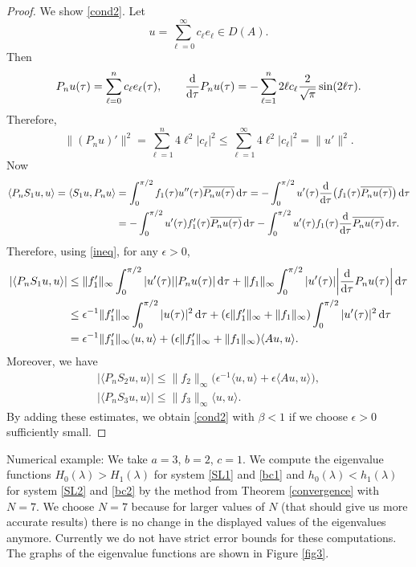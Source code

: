 \documentclass[10pt,a4paper]{amsart}
\numberwithin{equation}{section}
\begin{document}
\begin{proof}
We show \eqref{cond2}.
Let
\[ u=\sum_{\ell=0}^\infty c_\ell e_\ell \in D(A) .\]
Then
\[ P_n u(\tau)=\sum_{\ell=0}^n c_\ell e_\ell(\tau),\qquad \frac{{\rm d}}{{\rm d}\tau} P_n u(\tau)= -\sum_{\ell=1}^n 2\ell c_\ell\frac{2}{\sqrt\pi}\sin(2\ell \tau).\]
Therefore,
\begin{equation}\label{ineq}
 \|(P_n u)'\|^2=\sum_{\ell=1}^n 4\ell^2 |c_\ell|^2\le \sum_{\ell=1}^\infty 4\ell^2|c_\ell|^2=\|u'\|^2.
\end{equation}
Now
 \begin{align*}
\langle P_nS_1u,u\rangle=\langle S_1u,P_nu\rangle &{}=\int_0^{\pi/2} f_1(\tau)u''(\tau)\overline{P_n u(\tau)}\,{\rm d}\tau
 = -\int_0^{\pi/2} u'(\tau)\frac{{\rm d}}{{\rm d}\tau}\bigl( f_1(\tau)\overline{P_n u(\tau)}\bigr)\,{\rm d}\tau\\
&{}= - \int_0^{\pi/2} u'(\tau)f_1'(\tau)\overline{P_n u(\tau)}\,{\rm d}\tau-\int_0^{\pi/2} u'(\tau)f_1(\tau)\frac{{\rm d}}{{\rm d}\tau}\overline{P_n u(\tau)}\,{\rm d}\tau.
\end{align*}
Therefore, using \eqref{ineq}, for any $\epsilon>0$,
\begin{align*}
|\langle P_nS_1u,u\rangle|&\le \|f_1'\|_\infty \int_0^{\pi/2} |u'(\tau)||P_n u(\tau)|\,{\rm d}\tau +\|f_1\|_\infty \int_0^{\pi/2} |u'(\tau)|\biggl|\frac{{\rm d}}{{\rm d}\tau}P_n u(\tau)\biggr|\,{\rm d}\tau\\
&\le
\epsilon^{-1}\|f_1'\|_\infty\int_0^{\pi/2} |u(\tau)|^2\,{\rm d}\tau +
(\epsilon\|f_1'\|_\infty +\|f_1\|_\infty)\int_0^{\pi/2} |u'(\tau)|^2\,{\rm d}\tau\\
&= \epsilon^{-1}\|f_1'\|_\infty\langle u,u\rangle +(\epsilon\|f_1'\|_\infty+\|f_1\|_\infty) \langle Au,u\rangle .
\end{align*}
Moreover, we have
\begin{gather*}
|\langle P_n S_2u,u\rangle|\le \|f_2\|_\infty \bigl(\epsilon^{-1} \langle u,u\rangle +\epsilon \langle Au,u\rangle\bigr),\\
|\langle P_nS_3u,u\rangle|\le \|f_3\|_\infty \langle u,u\rangle.
\end{gather*}
By adding these estimates, we obtain \eqref{cond2}
with $\beta<1$ if we choose $\epsilon>0$ sufficiently small.
\end{proof}

Numerical example:
We take $a=3$, $b=2$, $c=1$. We compute the eigenvalue functions $H_0(\lambda)>H_1(\lambda)$ for system \eqref{SL1} and \eqref{bc1}
and $h_0(\lambda)<h_1(\lambda)$ for system \eqref{SL2} and \eqref{bc2} by the method from Theorem \ref{convergence} with $N=7$.
We choose $N=7$ because for larger values of $N$ (that should give us more accurate results) there is no change in the displayed values of the eigenvalues anymore. Currently we do not have strict error bounds for these computations.
The graphs of the eigenvalue functions are shown in Figure \ref{fig3}.
\end{document}
